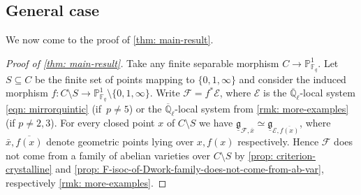 \documentclass[11pt]{article}
\numberwithin{equation}{subsection}
\theoremstyle{definition}
\newcommand{\Qlbar}{\overline{\mathbb{Q}}_{\ell}}
\let\mc\mathcal
\begin{document}
\subsection{General case}
We now come to the proof of \cref{thm: main-result}.

\begin{proof}[Proof of \cref{thm: main-result}]
Take any finite separable morphism $C\to\mathbb{P}^1_{\mathbb{F}_q}$. Let $S\subseteq C$ be the finite set of points mapping to $\{0,1,\infty\}$ and consider the induced morphism $f\colon C\setminus S\to\mathbb{P}^1_{\mathbb{F}_q}\setminus\{0,1,\infty\}$. Write $\mc{F}=f^\ast\mathcal{E}$, where $\mc{E}$ is the $\Qlbar$-local system \eqref{eqn: mirrorquintic} (if~$p\neq 5$) or the $\Qlbar$-local system from \cref{rmk: more-examples} (if $p\neq 2,3$). For every closed point $x$ of $C\setminus S$ we have $\underline{\mathfrak{g}}_{\mathcal{F},\bar x}\simeq \underline{\mathfrak{g}}_{\mathcal{E},\overline{f(x)}}$, where $\bar x,\overline{f(x)}$ denote geometric points lying over $x,f(x)$ respectively. Hence $\mathcal{F}$ does not come from a family of abelian varieties over $C\setminus S$ by \cref{prop: criterion-crystalline} and \cref{prop: F-isoc-of-Dwork-family-does-not-come-from-ab-var}, respectively \cref{rmk: more-examples}.
\end{proof}


\end{document}
